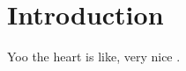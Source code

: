 \section{Introduction}
\setcounter{page}{1}
Yoo the heart is like, very nice \cite{fooHumanISL1Ventricular2018}.